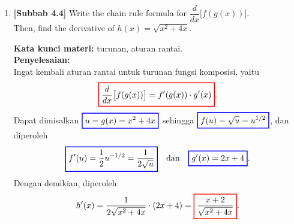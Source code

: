 \documentclass[10pt,openany,a4paper]{article}
\theoremstyle{definition}
\theoremstyle{definition}
\theoremstyle{plain}
\newenvironment{jawab}[2][tes]{%
\par\noindent\textbf{Kata kunci materi:} #1.\\
\textbf{Penyelesaian:} #2%
}{}
\begin{document}
\begin{enumerate}
    \item \textbf{[Subbab 4.4]} Write the chain rule formula for $\dfrac{d}{dx}\big[f(g(x))\big]$.\\
    Then, find the derivative of $h(x)=\sqrt{x^2+4x}$.
    \begin{jawab}[turunan, aturan rantai]{~\\
        Ingat kembali aturan rantai untuk turunan fungsi komposisi, yaitu
        \[
        \colorlet{oldcolor}{.}
        \color{red}
        \setlength{\fboxrule}{1pt} \boxed{\color{oldcolor}\frac{d}{dx}\big[f(g(x))\big] = f'(g(x)) \cdot g'(x)}\color{oldcolor}.
        \]
        Dapat dimisalkan $\colorlet{oldcolor}{.}
        \color{blue}
        \setlength{\fboxrule}{1pt} \boxed{\color{oldcolor}u=g(x)=x^2+4x}\color{oldcolor}$ sehingga $\colorlet{oldcolor}{.}
        \color{blue}
        \setlength{\fboxrule}{1pt} \boxed{\color{oldcolor}f(u)=\sqrt{u}=u^{1/2}}\color{oldcolor}$, dan diperoleh
        \begin{align*}
            \colorlet{oldcolor}{.}
        \color{blue}
        \setlength{\fboxrule}{1pt} \boxed{\color{oldcolor}f'(u)=\frac{1}{2}u^{-1/2}=\frac{1}{2\sqrt{u}}}\color{oldcolor} \quad\text{dan}\quad \colorlet{oldcolor}{.}
        \color{blue}
        \setlength{\fboxrule}{1pt} \boxed{\color{oldcolor}g'(x)=2x+4}\color{oldcolor}.
        \end{align*}
        Dengan demikian, diperoleh
        \begin{align*}
            h'(x) = \frac{1}{2\sqrt{x^2+4x}}\cdot(2x+4) = \colorlet{oldcolor}{.}
        \color{red}
        \setlength{\fboxrule}{1pt} \boxed{\color{oldcolor}\frac{x+2}{\sqrt{x^2+4x}}}\color{oldcolor}.
        \end{align*}
    }
    \end{jawab}


\end{enumerate}
\end{document}
